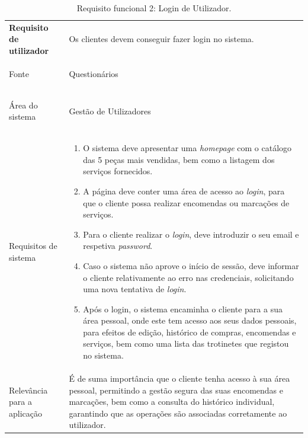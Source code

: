 \documentclass[a4paper,12pt]{scrreprt}
\begin{document}
\begin{table}[H]
    \centering
    \renewcommand{\arraystretch}{1.5} 
    
    \begin{tabular}{|>{\columncolor{gray!15}\bfseries}p{4cm}|p{10.5cm}|}
        \hline
        Requisito de utilizador & Os clientes devem conseguir fazer login no sistema. \\ \hdashline
        
        Fonte & Questionários \\ \hdashline
        
        Área do sistema & Gestão de Utilizadores \\ \hdashline
        
        Requisitos de sistema & 
        \begin{enumerate}[leftmargin=*, nosep, topsep=2pt, partopsep=0pt]
            \item O sistema deve apresentar uma \textit{homepage} com o catálogo das 5 peças mais vendidas, bem como a listagem dos serviços fornecidos.
            \item A página deve conter uma área de acesso ao \textit{login}, para que o cliente possa realizar encomendas ou marcações de serviços.
            \item Para o cliente realizar o \textit{login}, deve introduzir o seu email e respetiva \textit{password}.
            \item Caso o sistema não aprove o início de sessão, deve informar o cliente relativamente ao erro nas credenciais, solicitando uma nova tentativa de \textit{login}.
            \item Após o login, o sistema encaminha o cliente para a sua área pessoal, onde este tem acesso aos seus dados pessoais, para efeitos de edição, histórico de compras, encomendas e serviços, bem como uma lista das trotinetes que registou no sistema.
        \end{enumerate} \\ \hdashline
        
        Relevância para a aplicação & É de suma importância que o cliente tenha acesso à sua área pessoal, permitindo a gestão segura das suas encomendas e marcações, bem como a consulta do histórico individual, garantindo que as operações são associadas corretamente ao utilizador. \\ \hline
    \end{tabular}
    \caption{Requisito funcional 2: Login de Utilizador.}
    \label{tab:rf2}
\end{table}
\end{document}
